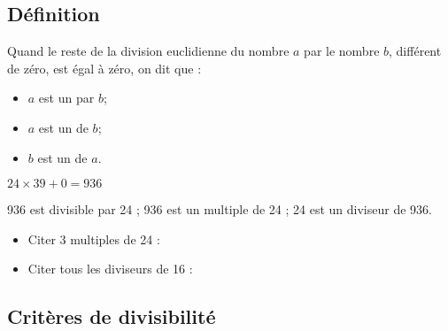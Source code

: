 \subsection{Définition}

\begin{mydefs}
	Quand le reste de la division euclidienne du nombre $a$ par le nombre $b$, différent de zéro, est égal à zéro, on dit que : 
	
	\begin{itemize}
		\item $a$ est un \hspace*{4cm} par $b$;
		\item $a$ est un \hspace*{4cm} de $b$;
		\item $b$ est un \hspace*{4cm} de $a$.
	\end{itemize}
	
\end{mydefs}

\begin{myex}
	\begin{multicols}{2}
		\begin{center}
		\end{center}
		
		$24 \times 39 + 0 = 936$
	\end{multicols}

	936 est divisible par 24 ; 936 est un multiple de 24 ; 24 est un diviseur de 936.
\end{myex}


\begin{myexo}
	\begin{itemize}
		\item Citer 3 multiples de 24 :
		\item Citer tous les diviseurs de 16 :
	\end{itemize}
\end{myexo}

\subsection{Critères de divisibilité}


